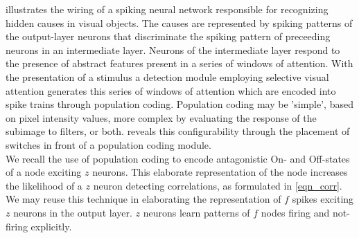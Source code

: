 \documentclass{report}
\begin{document}
 illustrates the wiring of a spiking neural network responsible for recognizing hidden causes in visual objects. The causes are represented by spiking patterns of the output-layer neurons that discriminate the spiking pattern of preceeding neurons in an intermediate layer. Neurons of the intermediate layer respond to the presence of abstract features present in a series of windows of attention. With the presentation of a stimulus a detection module employing selective visual attention generates this series of windows of attention which are encoded into spike trains through population coding. Population coding may be 'simple', based on pixel intensity values, more complex by evaluating the response of the subimage to filters, or both.  reveals this configurability through the placement of switches in front of a population coding module.\\

We recall the use of population coding to encode antagonistic On- and Off-states of a node exciting $z$ neurons. This elaborate representation of the node increases the likelihood of a $z$ neuron detecting correlations, as formulated in \ref{eqn_corr}. We may reuse this technique in elaborating the representation of $f$ spikes exciting $z$ neurons in the output layer. $z$ neurons learn patterns of $f$ nodes firing and not-firing explicitly.\\
\end{document}
